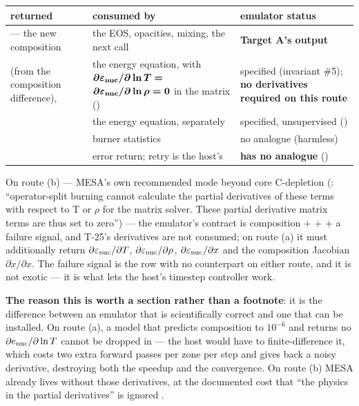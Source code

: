 \begingroup\small
\begin{tabularx}{\textwidth}{@{}L{3.6cm} L{4.6cm} Y@{}}
\toprule
\textbf{returned} & \textbf{consumed by} & \textbf{emulator status} \\
\midrule
{} --- the new composition &
  the EOS, opacities, mixing, the next call &
  \textbf{Target A's output} \\
 (from the composition difference),
   &
  the energy equation, with $\boldsymbol{\partial\varepsilon_{\mathrm{nuc}}/\partial\ln T =}$
  $\boldsymbol{\partial\varepsilon_{\mathrm{nuc}}/\partial\ln\rho = 0}$ in the matrix
  () &
  specified (invariant \#5); \textbf{no derivatives required on this route} \\
 &
  the energy equation, separately &
  specified, unsupervised () \\
 &
  burner statistics &
  no analogue (harmless) \\
 &
  error return; retry is the host's &
  \textbf{has no analogue} () \\
\bottomrule
\end{tabularx}
\endgroup

On route (b) --- MESA's own recommended mode beyond core C-depletion
(\citealt[\S 10.2]{jermyn2023}: ``operator-split burning cannot calculate the
partial derivatives of these terms with respect to T or $\rho$ for the matrix
solver. These partial derivative matrix terms are thus set to zero'') --- the
emulator's contract is composition $+$ \epsnuc{} $+$ \epsnu{} $+$ a failure
signal, and T-25's derivatives are not consumed; on route (a) it must
additionally return $\partial\varepsilon_{\mathrm{nuc}}/\partial T$,
$\partial\varepsilon_{\mathrm{nuc}}/\partial\rho$, $\partial\varepsilon_{\mathrm{nuc}}/\partial x$ and the
composition Jacobian $\partial\dot x/\partial x$. The failure signal is the row
with no counterpart on either route, and it is not exotic --- it is what lets
the host's timestep controller work.

\textbf{The reason this is worth a section rather than a footnote}: it is the
difference between an emulator that is scientifically correct and one that can
be installed. On route (a), a model that predicts composition to $10^{-6}$ and
returns no $\partial e_{\mathrm{nuc}}/\partial\ln T$ cannot be dropped in --- the host
would have to finite-difference it, which costs two extra forward passes per
zone per step and gives back a noisy derivative, destroying both the speedup
and the convergence. On route (b) MESA already lives without those derivatives,
at the documented cost that ``the physics in the partial derivatives'' is
ignored \citep[\S 10.2]{jermyn2023}.

